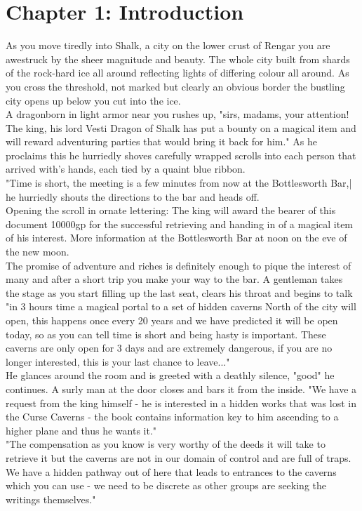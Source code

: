 \documentclass[10pt,twoside,twocolumn]{article}
\begin{document}
\section{Chapter 1: Introduction}
\begin{quotebox}
As you move tiredly into Shalk, a city on the lower crust of Rengar you are awestruck by the sheer magnitude and beauty. The whole city built from shards of the rock-hard ice all around reflecting lights of differing colour all around. As you cross the threshold, not marked but clearly an obvious border the bustling city opens up below you cut into the ice. \\

A dragonborn in light armor near you rushes up, "sirs, madams, your attention! The king, his lord Vesti Dragon of Shalk has put a bounty on a magical item and will reward adventuring parties that would bring it back for him." As he proclaims this he hurriedly shoves carefully wrapped scrolls into each person that arrived with's hands, each tied by a quaint blue ribbon. \\

"Time is short, the meeting is a few minutes from now at the Bottlesworth Bar,| he hurriedly shouts the directions to the bar and heads off.\\

Opening the scroll in ornate lettering: The king will award the bearer of this document 10000gp for the successful retrieving and handing in of a magical item of his interest. More information at the Bottlesworth Bar at noon on the eve of the new moon. \\

The promise of adventure and riches is definitely enough to pique the interest of many and after a short trip you make your way to the bar. A gentleman takes the stage as you start filling up the last seat, clears his throat and begins to talk "in 3 hours time a magical portal to a set of hidden caverns North of the city will open, this happens once every 20 years and we have predicted it will be open today, so as you can tell time is short and being hasty is important. These caverns are only open for 3 days and are extremely dangerous, if you are no longer interested, this is your last chance to leave..." \\

He glances around the room and is greeted with a deathly silence, "good" he continues. A surly man at the door closes and bars it from the inside. "We have a request from the king himself - he is interested in a hidden works that was lost in the Curse Caverns - the book contains information key to him ascending to a higher plane and thus he wants it." \\

"The compensation as you know is very worthy of the deeds it will take to retrieve it but the caverns are not in our domain of control and are full of traps. We have a hidden pathway out of here that leads to entrances to the caverns which you can use - we need to be discrete as other groups are seeking the writings themselves."
\end{quotebox}
\end{document}

